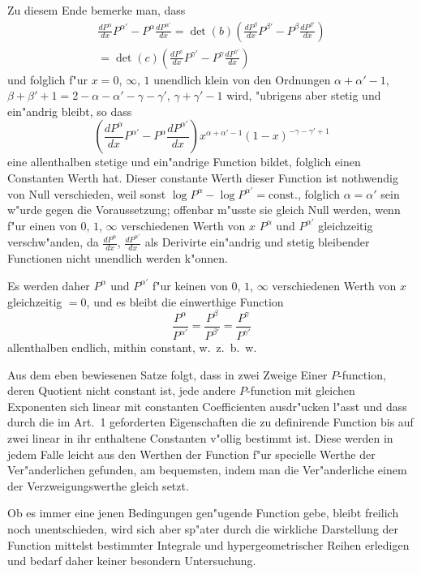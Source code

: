 \documentclass[12pt,a4paper]{book}
\theoremstyle{definition}
\theoremstyle{remark}
\begin{document}
Zu diesem Ende bemerke man, dass
\begin{multline*}
\frac{dP^{\alpha}}{dx} P^{\alpha'} - P^{\alpha} \frac{dP^{\alpha'}}{dx} = \det(b) \left(\frac{dP^{\beta}}{dx} P^{\beta'} - P^{\beta} \frac{dP^{\beta'}}{dx}\right) \\
= \det(c) \left(\frac{dP^{\gamma}}{dx} P^{\gamma'} - P^{\gamma} \frac{dP^{\gamma'}}{dx}\right)
\end{multline*}
und folglich f{"u}r $x = 0$, $\infty$, $1$ unendlich klein von den Ordnungen $\alpha + \alpha' - 1$, $\beta + \beta' + 1 = 2 - \alpha - \alpha' - \gamma - \gamma'$, $\gamma + \gamma' - 1$ wird, {"u}brigens aber stetig und ein{"a}ndrig bleibt, so dass
\[
\left(\frac{dP^{\alpha}}{dx} P^{\alpha'} - P^{\alpha} \frac{dP^{\alpha'}}{dx}\right) x^{\alpha+\alpha'-1} (1-x)^{-\gamma-\gamma'+1}
\]
eine allenthalben stetige und ein{"a}ndrige Function bildet, folglich einen Constanten Werth hat. Dieser constante Werth dieser Function ist nothwendig von Null verschieden, weil sonst $\log P^{\alpha} - \log P^{\alpha'} = \text{const.}$, folglich $\alpha = \alpha'$ sein w{"u}rde gegen die Voraussetzung; offenbar m{"u}sste sie gleich Null werden, wenn f{"u}r einen von $0$, $1$, $\infty$ verschiedenen Werth von $x$ $P^{\alpha}$ und $P^{\alpha'}$ gleichzeitig verschw{"a}nden, da $\frac{dP^{\alpha}}{dx}$, $\frac{dP^{\alpha'}}{dx}$ als Derivirte ein{"a}ndrig und stetig bleibender Functionen nicht unendlich werden k{"o}nnen.

Es werden daher $P^{\alpha}$ und $P^{\alpha'}$ f{"u}r keinen von $0$, $1$, $\infty$ verschiedenen Werth von $x$ gleichzeitig $= 0$, und es bleibt die einwerthige Function
\[
\frac{P^{\alpha}}{P^{\alpha'}} = \frac{P^{\beta}}{P^{\beta'}} = \frac{P^{\gamma}}{P^{\gamma'}}
\]
allenthalben endlich, mithin constant, w.~z.~b.~w.

Aus dem eben bewiesenen Satze folgt, dass in zwei Zweige Einer $P$-function, deren Quotient nicht constant ist, jede andere $P$-function mit gleichen Exponenten sich linear mit constanten Coefficienten ausdr{"u}cken l{"a}sst und dass durch die im Art.~1 geforderten Eigenschaften die zu definirende Function bis auf zwei linear in ihr enthaltene Constanten v{"o}llig bestimmt ist. Diese werden in jedem Falle leicht aus den Werthen der Function f{"u}r specielle Werthe der Ver{"a}nderlichen gefunden, am bequemsten, indem man die Ver{"a}nderliche einem der Verzweigungswerthe gleich setzt.

Ob es immer eine jenen Bedingungen gen{"u}gende Function gebe, bleibt freilich noch unentschieden, wird sich aber sp{"a}ter durch die wirkliche Darstellung der Function mittelst bestimmter Integrale und hypergeometrischer Reihen erledigen und bedarf daher keiner besondern Untersuchung.
\end{document}

